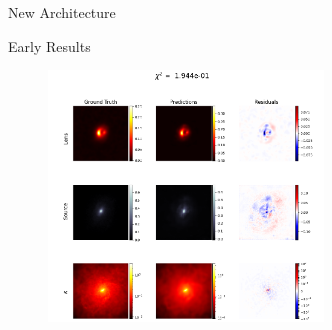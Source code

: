 \documentclass{beamer}
\begin{document}
\begin{frame}{New Architecture}{}
\begin{figure}[H]
        
\caption{}
\label{fig:}
\end{figure}

\end{frame}


\begin{frame}{Early Results}{}
\begin{figure}[H]
        \centering
        \includegraphics[width=0.65\textwidth]{figures/insane_residual}
        \caption{}
        \label{fig:}
\end{figure}
        

\end{frame}
\end{document}
